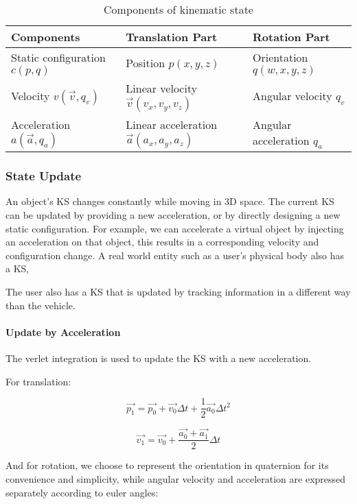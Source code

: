 \begin{table}[hbt]
\renewcommand{\arraystretch}{1.3}
\caption{Components of kinematic state}
\label{tab:5_ks_components}
\centering
\begin{tabular}{l l l}
  \hline
  Components & Translation Part & Rotation Part \\
  \hline
  Static configuration $c(p, q)$ & Position $p(x, y, z)$ & Orientation $q(w, x, y, z)$ \\
  Velocity $v(\overrightarrow{v}, q_{v})$ & Linear velocity $\overrightarrow{v}(v_{x}, v_{y}, v_{z})$ & Angular velocity $q_{v}$ \\
  Acceleration $a(\overrightarrow{a}, q_{a})$ & Linear acceleration $\overrightarrow{a}(a_{x}, a_{y}, a_{z})$ & Angular acceleration $q_{a}$ \\
  \hline
\end{tabular}
\end{table}


\subsubsection{State Update}
An object's KS changes constantly while moving in 3D space. The current KS can be updated by providing a new acceleration, or by directly designing a new static configuration. For example, we can accelerate a virtual object by injecting an acceleration on that object, this results in a corresponding velocity and configuration change. A real world entity such as a user's physical body also has a KS,

 The user also has a KS that is updated by tracking information in a different way than the vehicle.

\paragraph{Update by Acceleration}
The verlet integration is used to update the KS with a new acceleration.

For translation:

\[
\overrightarrow{p_{1}}=\overrightarrow{p_{0}}+\overrightarrow{v_{0}}\Delta t+\frac{1}{2}\overrightarrow{a_{0}}\Delta t^{2}
\]

\[
\overrightarrow{v_{1}}=\overrightarrow{v_{0}}+\frac{\overrightarrow{a_{0}}+\overrightarrow{a_{1}}}{2}\Delta t
\]

And for rotation, we choose to represent the orientation in quaternion for its convenience and simplicity, while angular velocity and acceleration are expressed separately according to euler angles:

